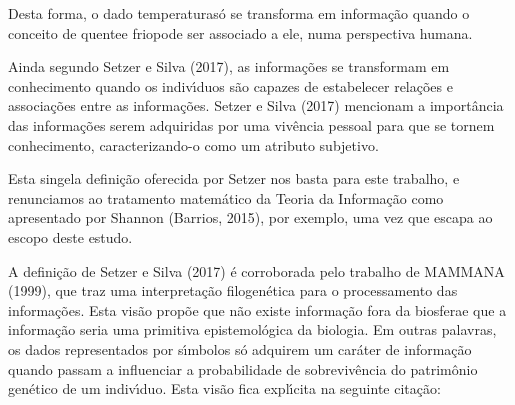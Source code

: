 \documentclass[
12pt,		%
openright,	%
twoside,  %
a4paper,			%
chapter=TITLE,		%
english,			%
french,				%
spanish,			%
brazil				%
]{USPSC-classe/USPSC}
\begin{document}
Desta forma, o dado \textquotedbl temperatura\textquotedbl  s\'o se transforma em informa\c{c}\~ao quando o conceito de \textquotedbl quente\textquotedbl  e \textquotedbl frio\textquotedbl  pode ser associado a ele, numa perspectiva humana.




Ainda segundo Setzer e Silva (2017), as informa\c{c}\~oes se transformam em conhecimento quando os indiv\'{\i}duos s\~ao capazes de estabelecer rela\c{c}\~oes e associa\c{c}\~oes entre as informa\c{c}\~oes.  Setzer e Silva (2017) mencionam a import\^ancia das informa\c{c}\~oes serem adquiridas por uma viv\^encia pessoal para que se tornem conhecimento, caracterizando-o como um atributo subjetivo.




Esta singela defini\c{c}\~ao oferecida por Setzer nos basta para este trabalho, e renunciamos ao tratamento matem\'atico da Teoria da Informa\c{c}\~ao como apresentado por Shannon (Barrios, 2015), por exemplo, uma vez que escapa ao escopo deste estudo.




A defini\c{c}\~ao de Setzer e Silva (2017) \'e corroborada pelo trabalho de MAMMANA (1999), que traz uma interpreta\c{c}\~ao filogen\'etica para o processamento das informa\c{c}\~oes. Esta vis\~ao prop\~oe que \textquotedbl n\~ao existe informa\c{c}\~ao fora da biosfera\textquotedbl  e que a informa\c{c}\~ao seria uma primitiva epistemol\'ogica da biologia. Em outras palavras, os dados representados por s\'{\i}mbolos s\'o adquirem um car\'ater de informa\c{c}\~ao quando passam a influenciar a probabilidade de sobreviv\^encia do patrim\^onio gen\'etico de um indiv\'{\i}duo. Esta vis\~ao fica expl\'{\i}cita na seguinte cita\c{c}\~ao:





\noindent\begin{center}\mbox{\centering{}}\end{center}
\end{document}

